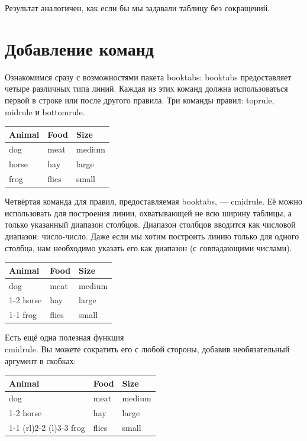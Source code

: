 \documentclass{article}
\begin{document}
  Результат аналогичен, как если бы мы задавали таблицу без сокращений.



  \section{Добавление команд}
  \label{sec:rules}
  

  Ознакомимся сразу с возможностями пакета booktabs:
  booktabs предоставляет четыре различных типа линий. Каждая из этих команд должна
  использоваться первой в строке или после другого правила. Три команды правил: toprule, midrule и bottomrule.

  \smallskip

  \begin{tabular}{lll}
  \toprule
    Animal & Food & Size \\
  \midrule
    dog & meat & medium \\
    horse & hay & large \\
    frog & flies & small \\
  \bottomrule
  \end{tabular}

  \smallskip

  Четвёртая команда для правил, предоставляемая booktabs, —  cmidrule. Её можно использовать
  для построения линии, охватывающей не всю ширину таблицы, а только указанный
  диапазон столбцов. Диапазон столбцов вводится как числовой диапазон: {число-число}.
  Даже если мы хотим построить линию только для одного столбца, нам необходимо указать его
  как диапазон (с совпадающими числами).

  \smallskip

  \begin{tabular}{lll}
  \toprule
    Animal & Food & Size \\
  \midrule
    dog & meat & medium \\
  \cmidrule{1-2}
    horse & hay & large \\
  \cmidrule{1-1}
  \cmidrule{3-3}
    frog & flies & small \\
  \bottomrule
  \end{tabular}


  Есть ещё одна полезная функция \\cmidrule. Вы можете сократить его с любой стороны,
  добавив необязательный аргумент в скобках:

  \smallskip

  \begin{tabular}{lll}
  \toprule
    Animal & Food & Size \\
  \midrule
    dog & meat & medium \\
  \cmidrule{1-2}
    horse & hay & large \\
  \cmidrule(r){1-1}
  \cmidrule(rl){2-2}
  \cmidrule(l){3-3}
    frog & flies & small \\
  \bottomrule
  \end{tabular}
\end{document}
